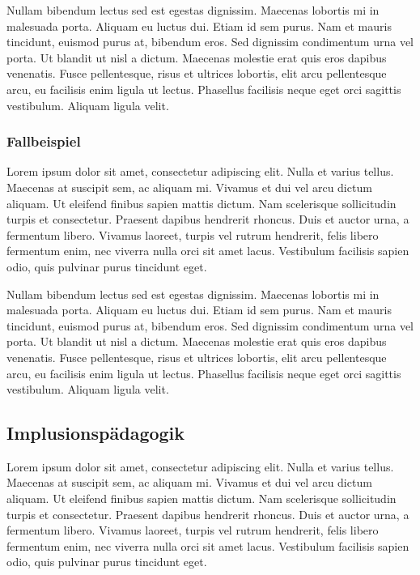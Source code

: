 \documentclass[
]{article}
\begin{document}
Nullam bibendum lectus sed est egestas dignissim. Maecenas lobortis mi
in malesuada porta. Aliquam eu luctus dui. Etiam id sem purus. Nam et
mauris tincidunt, euismod purus at, bibendum eros. Sed dignissim
condimentum urna vel porta. Ut blandit ut nisl a dictum. Maecenas
molestie erat quis eros dapibus venenatis. Fusce pellentesque, risus et
ultrices lobortis, elit arcu pellentesque arcu, eu facilisis enim ligula
ut lectus. Phasellus facilisis neque eget orci sagittis vestibulum.
Aliquam ligula velit.

\hypertarget{fallbeispiel}{%
\subsubsection{Fallbeispiel}\label{fallbeispiel}}

Lorem ipsum dolor sit amet, consectetur adipiscing elit. Nulla et varius
tellus. Maecenas at suscipit sem, ac aliquam mi. Vivamus et dui vel arcu
dictum aliquam. Ut eleifend finibus sapien mattis dictum. Nam
scelerisque sollicitudin turpis et consectetur. Praesent dapibus
hendrerit rhoncus. Duis et auctor urna, a fermentum libero. Vivamus
laoreet, turpis vel rutrum hendrerit, felis libero fermentum enim, nec
viverra nulla orci sit amet lacus. Vestibulum facilisis sapien odio,
quis pulvinar purus tincidunt eget.

Nullam bibendum lectus sed est egestas dignissim. Maecenas lobortis mi
in malesuada porta. Aliquam eu luctus dui. Etiam id sem purus. Nam et
mauris tincidunt, euismod purus at, bibendum eros. Sed dignissim
condimentum urna vel porta. Ut blandit ut nisl a dictum. Maecenas
molestie erat quis eros dapibus venenatis. Fusce pellentesque, risus et
ultrices lobortis, elit arcu pellentesque arcu, eu facilisis enim ligula
ut lectus. Phasellus facilisis neque eget orci sagittis vestibulum.
Aliquam ligula velit.

\hypertarget{implusionspuxe4dagogik}{%
\subsection{Implusionspädagogik}\label{implusionspuxe4dagogik}}

Lorem ipsum dolor sit amet, consectetur adipiscing elit. Nulla et varius
tellus. Maecenas at suscipit sem, ac aliquam mi. Vivamus et dui vel arcu
dictum aliquam. Ut eleifend finibus sapien mattis dictum. Nam
scelerisque sollicitudin turpis et consectetur. Praesent dapibus
hendrerit rhoncus. Duis et auctor urna, a fermentum libero. Vivamus
laoreet, turpis vel rutrum hendrerit, felis libero fermentum enim, nec
viverra nulla orci sit amet lacus. Vestibulum facilisis sapien odio,
quis pulvinar purus tincidunt eget.
\end{document}
